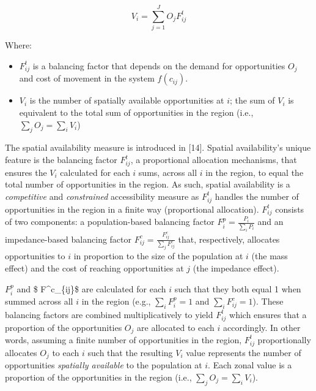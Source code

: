\documentclass[10pt,letterpaper]{article}
\providecommand{\tightlist}{%
  \setlength{\itemsep}{0pt}\setlength{\parskip}{0pt}}
\begin{document}
\begin{equation}
\label{eq:spatial-availability-general}
V_i = \sum_{j=1}^J O_jF^t_{ij}
\end{equation}

\noindent Where:

\begin{itemize}
\tightlist
\item
  \(F^t_{ij}\) is a balancing factor that depends on the demand for
  opportunities \(O_j\) and cost of movement in the system
  \(f(c_{ij})\).
\item
  \(V_i\) is the number of spatially available opportunities at \(i\);
  the sum of \(V_{i}\) is equivalent to the total sum of opportunities
  in the region (i.e., \(\sum_j O_j = \sum_i V_i\))
\end{itemize}

The spatial availability measure is introduced in {[}14{]}. Spatial
availability's unique feature is the balancing factor \(F^t_{ij}\), a
proportional allocation mechanisms, that ensures the \(V_i\) calculated
for each \(i\) sums, across all \(i\) in the region, to equal the total
number of opportunities in the region. As such, spatial availability is
a \emph{competitive} and \emph{constrained} accessibility measure as
\(F^t_{ij}\) handles the number of opportunities in the region in a
finite way (proportional allocation). \(F^t_{ij}\) consists of two
components: a population-based balancing factor
\(F^p_{i} = \frac{P_i}{\sum_i P_i}\) and an impedance-based balancing
factor \(F^c_{ij} = \frac{F^c_{ij}}{\sum_j F^c_{ij}}\) that,
respectively, allocates opportunities to \(i\) in proportion to the size
of the population at \(i\) (the mass effect) and the cost of reaching
opportunities at \(j\) (the impedance effect).

\(F^p_{i}\) and \$ F\^{}c\_\{ij\}\$ are calculated for each \(i\) such
that they both equal 1 when summed across all \(i\) in the region (e.g.,
\(\sum_i F^p_{i} = 1\) and \(\sum_i F^c_{ij} = 1\)). These balancing
factors are combined multiplicatively to yield \(F^t_{ij}\) which
ensures that a proportion of the opportunities \(O_j\) are allocated to
each \(i\) accordingly. In other words, assuming a finite number of
opportunities in the region, \(F^t_{ij}\) proportionally allocates
\(O_j\) to each \(i\) such that the resulting \(V_i\) value represents
the number of opportunities \emph{spatially available} to the population
at \(i\). Each zonal value is a proportion of the opportunities in the
region (i.e., \(\sum_j O_j = \sum_i V_i\)).
\end{document}
